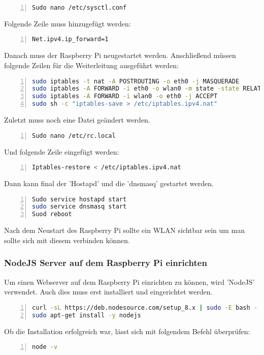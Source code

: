 \begin{lstlisting}[caption={Konfiguration IPV4 Schritt 1}, language={bash}, numbers=left]
Sudo nano /etc/sysctl.conf
\end{lstlisting}
Folgende Zeile muss hinzugefügt werden:
\begin{lstlisting}[caption={Konfiguration IPV4 Schritt 2}, language={bash}, numbers=left]
Net.ipv4.ip_forward=1
\end{lstlisting}
Danach muss der Raspberry Pi neugestartet werden.
Anschließend müssen folgende Zeilen für die Weiterleitung ausgeführt werden:
\begin{lstlisting}[caption={Konfiguration IPV4 Schritt 3}, language={bash}, numbers=left]
sudo iptables -t nat -A POSTROUTING -o eth0 -j MASQUERADE
sudo iptables -A FORWARD -i eth0 -o wlan0 -m state -state RELATED,ESTABLISHED -j ACCEPT
sudo iptables -A FORWARD -i wlan0 -o eth0 -j ACCEPT
sudo sh -c "iptables-save > /etc/iptables.ipv4.nat"
\end{lstlisting}
Zuletzt muss noch eine Datei geändert werden.
\begin{lstlisting}[caption={Konfiguration IPV4 Schritt 4}, language={bash}, numbers=left]
Sudo nano /etc/rc.local
\end{lstlisting}
Und folgende Zeile eingefügt werden:
\begin{lstlisting}[caption={Konfiguration IPV4 Schritt 5}, language={bash}, numbers=left]
Iptables-restore < /etc/iptables.ipv4.nat
\end{lstlisting}
Dann kann final der 'Hostapd' und die 'dnsmasq' gestartet werden.
\begin{lstlisting}[caption={Starten der neu installierten Packages}, language={bash}, numbers=left]
Sudo service hostapd start
sudo service dnsmasq start
Suod reboot
\end{lstlisting}
Nach dem Neustart des Raspberry Pi sollte ein \ac{WLAN} sichtbar sein um man sollte sich mit diesem verbinden können.\cite{raspi1}\cite{raspi2}
\newpage
\subsubsection{NodeJS Server auf dem Raspberry Pi einrichten}
Um einen Webserver auf dem Raspberry Pi einrichten zu können, wird 'NodeJS' verwendet. Auch dies muss erst installiert und eingerichtet werden.\cite{nodejs}
\begin{lstlisting}[caption={Installation NodeJS Schritt 1}, language={bash}, numbers=left]
curl -sL https://deb.nodesource.com/setup_8.x | sudo -E bash -
sudo apt-get install -y nodejs
\end{lstlisting}
Ob die Installation erfolgreich war, lässt sich mit folgendem Befehl überprüfen:
\begin{lstlisting}[caption={Installation NodeJS Schritt 2}, language={bash}, numbers=left]
node -v
\end{lstlisting}


